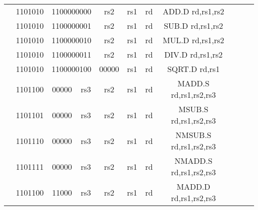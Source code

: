 \begin{table}[p]
\begin{small}
\begin{center}
\begin{tabular}{rcccccccccccl}
&
\multicolumn{1}{|c|}{1101010} &
\multicolumn{4}{c|}{1100000000} &
\multicolumn{1}{c|}{rs2} &
\multicolumn{1}{c|}{rs1} &
\multicolumn{1}{c|}{rd} & ADD.D rd,rs1,rs2 \\
\cline{2-9}
  

&
\multicolumn{1}{|c|}{1101010} &
\multicolumn{4}{c|}{1100000001} &
\multicolumn{1}{c|}{rs2} &
\multicolumn{1}{c|}{rs1} &
\multicolumn{1}{c|}{rd} & SUB.D rd,rs1,rs2 \\
\cline{2-9}
  

&
\multicolumn{1}{|c|}{1101010} &
\multicolumn{4}{c|}{1100000010} &
\multicolumn{1}{c|}{rs2} &
\multicolumn{1}{c|}{rs1} &
\multicolumn{1}{c|}{rd} & MUL.D rd,rs1,rs2 \\
\cline{2-9}
  

&
\multicolumn{1}{|c|}{1101010} &
\multicolumn{4}{c|}{1100000011} &
\multicolumn{1}{c|}{rs2} &
\multicolumn{1}{c|}{rs1} &
\multicolumn{1}{c|}{rd} & DIV.D rd,rs1,rs2 \\
\cline{2-9}
  

&
\multicolumn{1}{|c|}{1101010} &
\multicolumn{4}{c|}{1100000100} &
\multicolumn{1}{c|}{00000} &
\multicolumn{1}{c|}{rs1} &
\multicolumn{1}{c|}{rd} & SQRT.D rd,rs1 \\
\cline{2-9}
  

&
\multicolumn{1}{|c|}{1101100} &
\multicolumn{2}{c|}{00000} &
\multicolumn{2}{c|}{rs3} &
\multicolumn{1}{c|}{rs2} &
\multicolumn{1}{c|}{rs1} &
\multicolumn{1}{c|}{rd} & MADD.S rd,rs1,rs2,rs3 \\
\cline{2-9}
  

&
\multicolumn{1}{|c|}{1101101} &
\multicolumn{2}{c|}{00000} &
\multicolumn{2}{c|}{rs3} &
\multicolumn{1}{c|}{rs2} &
\multicolumn{1}{c|}{rs1} &
\multicolumn{1}{c|}{rd} & MSUB.S rd,rs1,rs2,rs3 \\
\cline{2-9}
  

&
\multicolumn{1}{|c|}{1101110} &
\multicolumn{2}{c|}{00000} &
\multicolumn{2}{c|}{rs3} &
\multicolumn{1}{c|}{rs2} &
\multicolumn{1}{c|}{rs1} &
\multicolumn{1}{c|}{rd} & NMSUB.S rd,rs1,rs2,rs3 \\
\cline{2-9}
  

&
\multicolumn{1}{|c|}{1101111} &
\multicolumn{2}{c|}{00000} &
\multicolumn{2}{c|}{rs3} &
\multicolumn{1}{c|}{rs2} &
\multicolumn{1}{c|}{rs1} &
\multicolumn{1}{c|}{rd} & NMADD.S rd,rs1,rs2,rs3 \\
\cline{2-9}
  

&
\multicolumn{1}{|c|}{1101100} &
\multicolumn{2}{c|}{11000} &
\multicolumn{2}{c|}{rs3} &
\multicolumn{1}{c|}{rs2} &
\multicolumn{1}{c|}{rs1} &
\multicolumn{1}{c|}{rd} & MADD.D rd,rs1,rs2,rs3 \\
\cline{2-9}
  


\end{tabular}
\end{center}
\end{small}
\end{table}

